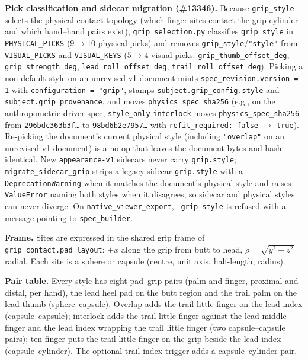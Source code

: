 \documentclass[11pt,a4paper]{article}
\begin{document}
\textbf{Pick classification and sidecar migration (\#13346).} Because
\texttt{grip\_style} selects the physical contact topology (which finger sites
contact the grip cylinder and which hand--hand pairs exist),
\texttt{grip\_selection.py} classifies \texttt{grip\_style} in
\texttt{PHYSICAL\_PICKS} ($9 \to 10$ physical picks) and removes
\texttt{grip\_style}/\texttt{"style"} from \texttt{VISUAL\_PICKS} and
\texttt{VISUAL\_KEYS} ($5 \to 4$ visual picks: \texttt{grip\_thumb\_offset\_deg},
\texttt{grip\_strength\_deg}, \texttt{lead\_roll\_offset\_deg},
\texttt{trail\_roll\_offset\_deg}).  Picking a non-default style on an
unrevised v1 document mints \texttt{spec\_revision.version = 1} with
\texttt{configuration = "grip"}, stamps \texttt{subject.grip\_config.style} and
\texttt{subject.grip\_provenance}, and moves \texttt{physics\_spec\_sha256}
(e.g., on the anthropometric driver spec, \texttt{style\_only}
\texttt{interlock} moves \texttt{physics\_spec\_sha256} from
\texttt{296bdc363b3f\dots} to \texttt{98bd6b2e7957\dots} with
\texttt{refit\_required: false} $\to$ \texttt{true}).  Re-picking the
document's current physical style (including \texttt{"overlap"} on an unrevised
v1 document) is a no-op that leaves the document bytes and hash identical.
New \texttt{appearance-v1} sidecars never carry \texttt{grip.style};
\texttt{migrate\_sidecar\_grip} strips a legacy sidecar \texttt{grip.style}
with a \texttt{DeprecationWarning} when it matches the document's physical
style and raises \texttt{ValueError} naming both styles when it disagrees, so
sidecar and physical styles can never diverge.  On \texttt{native\_viewer\_export},
\texttt{--grip-style} is refused with a message pointing to \texttt{spec\_builder}.

\textbf{Frame.} Sites are expressed in the shared grip frame of
\texttt{grip\_contact.pad\_layout}: $+x$ along the grip from butt to head,
$\rho=\sqrt{y^2+z^2}$ radial.  Each site is a sphere or capsule
(centre, unit axis, half-length, radius).

\textbf{Pair table.} Every style has eight pad--grip pairs (palm and finger,
proximal and distal, per hand), the lead heel pad on the butt region and the
trail palm on the lead thumb (sphere--capsule).  Overlap adds the trail little
finger on the lead index (capsule--capsule); interlock adds the trail little
finger against the lead middle finger and the lead index wrapping the trail
little finger (two capsule--capsule pairs); ten-finger puts the trail little
finger on the grip beside the lead index (capsule--cylinder).  The optional
trail index trigger adds a capsule--cylinder pair.
\end{document}
